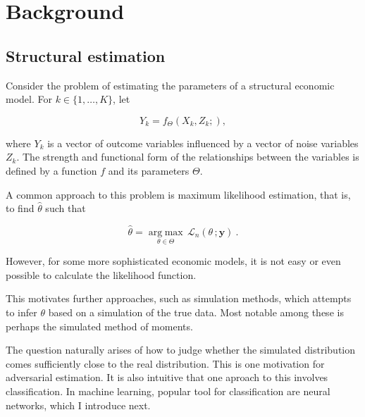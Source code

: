
\section{Background} %
\label{sec:background}


\subsection{Structural estimation}
\label{sec:structural_estimation}

Consider the problem of estimating the parameters of a structural economic model.
For $k \in \{1,\dots,K\}$, let

\begin{equation}
    Y_k = f_{\Theta}(X_k, Z_k; ),
\end{equation}

where $Y_k$ is a vector of outcome variables influenced by a vector of noise variables $Z_k$. %
The strength and functional form of the relationships between the variables is defined by a function $f$ and its parameters $\Theta$.

A common approach to this problem is maximum likelihood estimation, that is, to find $\hat{\theta}$ such that

\begin{equation}
    \hat{\theta} = \underset{\theta\in\Theta}{\operatorname{arg\;max}}\,\mathcal{L}_{n}(\theta\,;\mathbf{y}) ~.
\end{equation}

However, for some more sophisticated economic models, it is not easy or even possible to calculate the likelihood function.

This motivates further approaches, such as simulation methods, which attempts to infer $\theta$ based on a simulation of the true data.
Most notable among these is perhaps the simulated method of moments.

The question naturally arises of how to judge whether the simulated distribution comes sufficiently close to the real distribution.
This is one motivation for adversarial estimation.
It is also intuitive that one aproach to this involves classification.
In machine learning, popular tool for classification are neural networks, which I introduce next.

